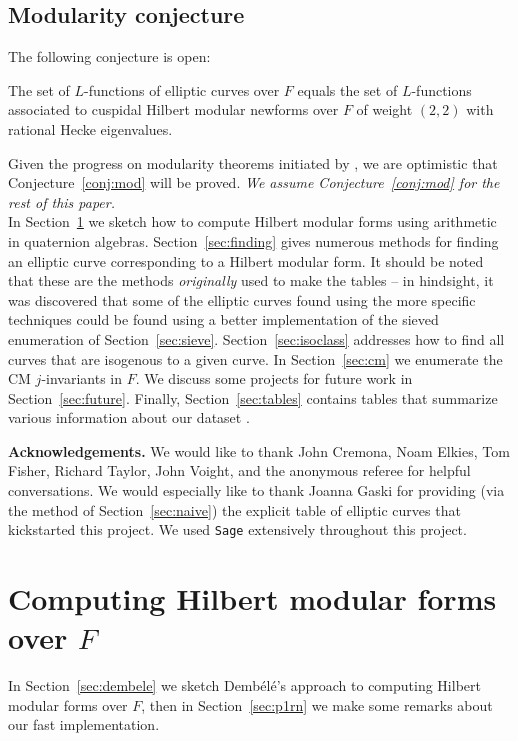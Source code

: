 \documentclass{amsart}
\newcommand{\dembele}{Demb\'el{\'e}\xspace}
\begin{document}
\subsection{Modularity conjecture}\label{sec:mod}
The following conjecture is open:
\begin{conjecture}[Modularity]\label{conj:mod}
  The set of $L$-functions of elliptic curves over $F$ equals the set
  of $L$-functions associated to cuspidal Hilbert modular newforms
  over $F$ of weight $(2,2)$ with rational Hecke eigenvalues.
\end{conjecture}
Given the progress on modularity theorems initiated by
\cite{wiles:fermat}, we are optimistic that Conjecture~\ref{conj:mod}
will be proved.  {\em We assume Conjecture~\ref{conj:mod} 
for the rest of this paper.} \\

In Section~\ref{sec:hmf} we sketch how to compute Hilbert modular
forms using arithmetic in quaternion algebras. Section~\ref{sec:finding} 
gives numerous methods for finding an elliptic curve corresponding to
a Hilbert modular form. It should be noted that these are the methods 
{\it originally} used to make the tables -- in hindsight, it was discovered
that some of the elliptic curves found using the more specific techniques could 
be found using a better implementation of the sieved enumeration of
Section~\ref{sec:sieve}.
Section~\ref{sec:isoclass} addresses how to find all curves that are
isogenous to a given curve.  
In Section~\ref{sec:cm} we enumerate the CM $j$-invariants in $F$.
We discuss some projects for future work in
Section~\ref{sec:future}.  Finally, Section~\ref{sec:tables} contains
tables that summarize various information about our
dataset \cite{sqrt5data}.


{\bf Acknowledgements.} We would like to thank John Cremona, Noam Elkies, Tom
Fisher, Richard Taylor, John Voight, and the anonymous referee for helpful
conversations.  We would especially like to thank Joanna Gaski for
providing (via the method of Section~\ref{sec:naive}) the explicit
table of elliptic curves that kickstarted this project.
We used {\tt Sage} \cite{sage} extensively throughout this project.

\section{Computing Hilbert modular forms over $F$}\label{sec:hmf}

In Section~\ref{sec:dembele} we sketch \dembele's approach to computing Hilbert
modular forms over $F$, then in Section~\ref{sec:p1rn} we make
some remarks about our fast implementation. 
\end{document}
